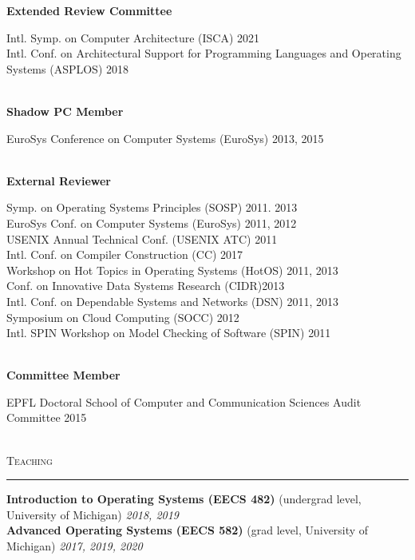 \documentclass[10pt]{article}
\newcommand{\mysec}[1]{\vspace{2em}\textsc{\large #1}\vspace{1mm}\hrule\vspace{2mm}}
\newcommand{\mysub}[3]{\textbf{#1} {#2} \hfill {\em #3}}
\newcommand{\myssub}[1]{\hspace*{2mm}\parbox{163mm}{#1}\vspace*{2mm}}
\begin{document}
\mysub{Extended Review Committee}{}{}\\
\myssub{\vspace{2mm}
  Intl. Symp. on Computer Architecture (ISCA) \hfill 2021 \\
  Intl. Conf. on Architectural Support for Programming Languages and Operating Systems (ASPLOS) \hfill 2018 \\
}\\

\mysub{Shadow PC Member}{}{} \\ 
\myssub{\vspace{2mm}EuroSys Conference on Computer Systems (EuroSys) \hfill 2013, 2015} \\

\mysub{External Reviewer}{}{} \\ 
\myssub{\vspace{2mm}Symp. on Operating Systems Principles (SOSP) \hfill 2011. 2013 \\
EuroSys Conf. on Computer Systems (EuroSys) \hfill 2011, 2012 \\
USENIX Annual Technical Conf. (USENIX ATC) \hfill 2011 \\
Intl. Conf. on Compiler Construction (CC) \hfill 2017 \\
Workshop on Hot Topics in Operating Systems (HotOS) \hfill 2011, 2013 \\
Conf. on Innovative Data Systems Research (CIDR)\hfill 2013\\
Intl. Conf. on Dependable Systems and Networks (DSN) \hfill 2011, 2013 \\
Symposium on Cloud Computing (SOCC) \hfill 2012 \\
Intl. SPIN Workshop on Model Checking of Software (SPIN) \hfill 2011} \\

\mysub{Committee Member}{}{} \\
\myssub{\vspace{2mm}EPFL Doctoral School of Computer and Communication Sciences Audit Committee \hfill 2015}\\

\mysec{Teaching}
\mysub{Introduction to Operating Systems (EECS 482)}{(undergrad level, University of Michigan)}{\rm 2018, 2019\vspace{2mm}} \\
\mysub{Advanced Operating Systems (EECS 582)}{(grad level, University of Michigan)}{\rm 2017, 2019, 2020\vspace{2mm}} 
\end{document}
